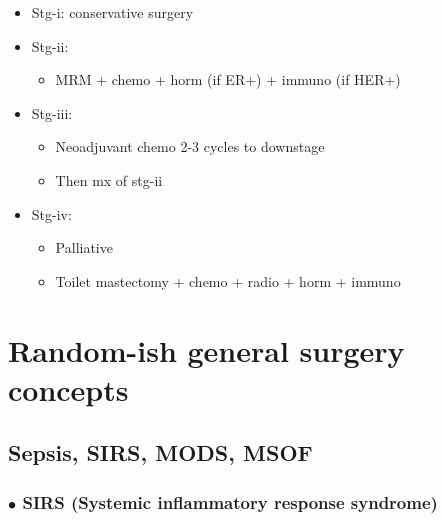 \documentclass[
  12pt,
]{memoir}
\providecommand{\tightlist}{%
  \setlength{\itemsep}{0pt}\setlength{\parskip}{0pt}}
\begin{document}
\begin{itemize}
\tightlist
\item
  Stg-i: conservative surgery
\item
  Stg-ii:

  \begin{itemize}
  \tightlist
  \item
    MRM + chemo + horm (if ER+) + immuno (if HER+)
  \end{itemize}
\item
  Stg-iii:

  \begin{itemize}
  \tightlist
  \item
    Neoadjuvant chemo 2-3 cycles to downstage
  \item
    Then mx of stg-ii
  \end{itemize}
\item
  Stg-iv:

  \begin{itemize}
  \tightlist
  \item
    Palliative
  \item
    Toilet mastectomy + chemo + radio + horm + immuno
  \end{itemize}
\end{itemize}

\pagebreak

\hypertarget{random-ish-general-surgery-concepts}{%
\chapter{Random-ish general surgery
concepts}\label{random-ish-general-surgery-concepts}}

\hypertarget{sepsis-sirs-mods-msof}{%
\section{Sepsis, SIRS, MODS, MSOF}\label{sepsis-sirs-mods-msof}}

\hypertarget{bullet-sirs-systemic-inflammatory-response-syndrome}{%
\subsection{\texorpdfstring{\(\bullet\) SIRS (Systemic inflammatory
response
syndrome)}{\textbackslash bullet SIRS (Systemic inflammatory response syndrome)}}\label{bullet-sirs-systemic-inflammatory-response-syndrome}}
\end{document}
